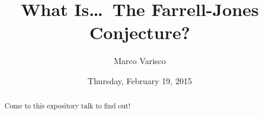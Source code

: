\documentclass{UAmathtalk}
\author{Marco Varisco}
\title{What Is\ldots\ The Farrell-Jones Conjecture?}
\date{Thursday, February 19, 2015}
\begin{document}
\maketitle

\begin{abstract}
Come to this expository talk to find out!
\end{abstract}
\end{document}
